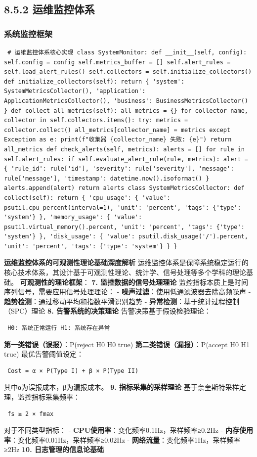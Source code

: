 \subsection{8.5.2 运维监控体系}\label{ux8fd0ux7ef4ux76d1ux63a7ux4f53ux7cfb} \subsubsection{系统监控框架}\label{ux7cfbux7edfux76d1ux63a7ux6846ux67b6} \begin{verbatim} # 运维监控体系核心实现 class SystemMonitor: def __init__(self, config): self.config = config self.metrics_buffer = [] self.alert_rules = self.load_alert_rules() self.collectors = self.initialize_collectors() def initialize_collectors(self): return { 'system': SystemMetricsCollector(), 'application': ApplicationMetricsCollector(), 'business': BusinessMetricsCollector() } def collect_all_metrics(self): all_metrics = {} for collector_name, collector in self.collectors.items(): try: metrics = collector.collect() all_metrics[collector_name] = metrics except Exception as e: print(f"收集器 {collector_name} 失败: {e}") return all_metrics def check_alerts(self, metrics): alerts = [] for rule in self.alert_rules: if self.evaluate_alert_rule(rule, metrics): alert = { 'rule_id': rule['id'], 'severity': rule['severity'], 'message': rule['message'], 'timestamp': datetime.now().isoformat() } alerts.append(alert) return alerts class SystemMetricsCollector: def collect(self): return { 'cpu_usage': { 'value': psutil.cpu_percent(interval=1), 'unit': 'percent', 'tags': {'type': 'system'} }, 'memory_usage': { 'value': psutil.virtual_memory().percent, 'unit': 'percent', 'tags': {'type': 'system'} }, 'disk_usage': { 'value': psutil.disk_usage('/').percent, 'unit': 'percent', 'tags': {'type': 'system'} } } \end{verbatim} \textbf{运维监控体系的可观测性理论基础深度解析} 运维监控体系是保障系统稳定运行的核心技术体系，其设计基于可观测性理论、统计学、信号处理等多个学科的理论基础。 \textbf{可观测性的理论框架}： \textbf{7. 监控数据的信号处理理论} 监控指标本质上是时间序列信号，需要应用信号处理理论： - \textbf{噪声过滤}：使用低通滤波器去除高频噪声 - \textbf{趋势检测}：通过移动平均和指数平滑识别趋势 - \textbf{异常检测}：基于统计过程控制（SPC）理论 \textbf{8. 告警系统的决策理论} 告警决策基于假设检验理论： \begin{verbatim} H0: 系统正常运行 H1: 系统存在异常 \end{verbatim} \textbf{第一类错误（误报）}：P(reject H0 \textbar{} H0 true) \textbf{第二类错误（漏报）}：P(accept H0 \textbar{} H1 true) 最优告警阈值设定： \begin{verbatim} Cost = α × P(Type I) + β × P(Type II) \end{verbatim} 其中α为误报成本，β为漏报成本。 \textbf{9. 指标采集的采样理论} 基于奈奎斯特采样定理，监控指标采集频率： \begin{verbatim} fs ≥ 2 × fmax \end{verbatim} 对于不同类型指标： - \textbf{CPU使用率}：变化频率0.1Hz，采样频率≥0.2Hz - \textbf{内存使用率}：变化频率0.01Hz，采样频率≥0.02Hz - \textbf{网络流量}：变化频率1Hz，采样频率≥2Hz \textbf{10. 日志管理的信息论基础} 